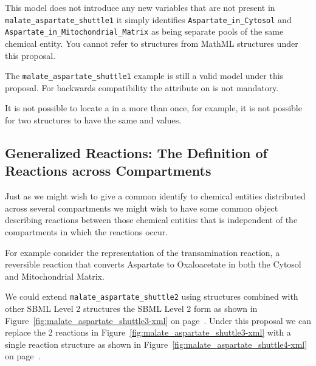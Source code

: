 \documentclass{cekarticle}
\begin{document}
This model does not introduce any new variables that are not present in
\texttt{malate\_aspartate\_shuttle1} it simply identifies \texttt{Aspartate\_in\_Cytosol}
and \texttt{Aspartate\_in\_Mitochondrial\_Matrix} as being separate pools of the same chemical entity.
You cannot refer to  structures from MathML structures under this proposal.

The \texttt{malate\_aspartate\_shuttle1} example is still a valid model under this proposal.
For backwards compatibility the  attribute on  is not
mandatory.

It is not possible to locate a  in a
 more than once, for example, it is not
possible for two  structures to have the same
 and  values.

\subsection{Generalized Reactions: The Definition of Reactions across Compartments}
\label{sec:commonreaction}

Just as we might wish to give a common identify to chemical entities distributed across several
compartments we might wish to have some common object describing reactions between those chemical
entities that is independent of the compartments in which the reactions occur.

For example consider the representation of the transamination reaction, a reversible reaction
that converts Aspartate to Oxaloacetate in both the Cytosol and Mitochondrial Matrix.

We could extend \texttt{malate\_aspartate\_shuttle2} using
 structures combined with other SBML Level 2
structures the SBML Level 2 form as shown in
Figure~\ref{fig:malate_aspartate_shuttle3-xml} on
page~\pageref{fig:malate_aspartate_shuttle3-xml}. Under this
proposal we can replace the 2 reactions in
Figure~\ref{fig:malate_aspartate_shuttle3-xml} with a single
reaction structure as shown in
Figure~\ref{fig:malate_aspartate_shuttle4-xml} on
page~\pageref{fig:malate_aspartate_shuttle4-xml}.
\end{document}
